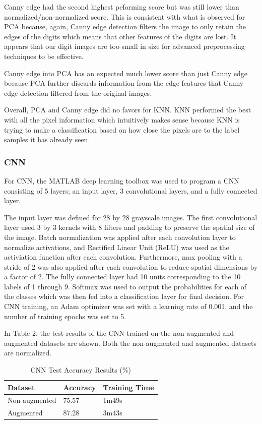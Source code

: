 \documentclass{article}
\begin{document}
Canny edge had the second highest peforming score but was still lower than
normalized/non-normalized score. This is consistent with what is observed for
PCA because, again, Canny edge detection filters the image to only retain the
edges of the digits which means that other features of the digits are lost. It
appears that our digit images are too small in size for advanced preprocessing
techniques to be effective.

Canny edge into PCA has an expected much lower score than just Canny edge
because PCA further discards information from the edge features that Canny edge
detection filtered from the original images.

Overall, PCA and Canny edge did no favors for KNN. KNN performed the best with
all the pixel information which intuitively makes sense because KNN is trying to
make a classification based on how close the pixels are to the label samples it
has already seen.

\subsubsection{CNN}

For CNN, the MATLAB deep learning toolbox was used to program a CNN consisting
of 5 layers; an input layer, 3 convolutional layers, and a fully connected
layer.

The input layer was defined for 28 by 28 grayscale images. The first
convolutional layer used 3 by 3 kernels with 8 filters and padding to preserve
the spatial size of the image. Batch normalization was applied after each
convolution layer to normalize activations, and Rectified Linear Unit (ReLU) was
used as the activiation function after each convolution. Furthermore, max
pooling with a stride of 2 was also applied after each convolution to reduce
spatial dimensions by a factor of 2. The fully connected layer had 10 units
corresponding to the 10 labels of 1 through 9. Softmax was used to output the
probabilities for each of the classes which was then fed into a classification
layer for final decision. For CNN training, an Adam optimizer was set with a
learning rate of 0.001, and the number of training epochs was set to 5.

In Table 2, the test results of the CNN trained on the non-augmented and
augmented datasets are shown. Both the non-augmented and augmented datasets are
normalized.

\begin{table}[h]
  \caption{CNN Test Accuracy Results (\%)}
  \centering
  \begin{tabular}{lll}
    \toprule
    Dataset & Accuracy & Training Time \\
    \midrule
    Non-augmented & 75.57 & 1m49s\\
    Augmented & 87.28 & 3m43s\\
    \bottomrule
  \end{tabular}
\end{table}
\end{document}
